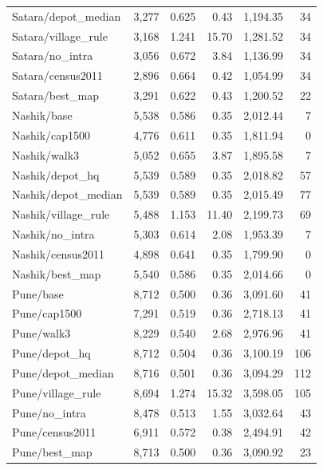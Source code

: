 \documentclass[11pt,a4paper,oneside]{report}
\begin{document}
\begin{center}
\begin{longtable}{p{4.5cm}rrrrr}
Satara/depot\_median & 3,277 & 0.625 & 0.43 & 1,194.35 & 34\\
Satara/village\_rule & 3,168 & 1.241 & 15.70 & 1,281.52 & 34\\
Satara/no\_intra & 3,056 & 0.672 & 3.84 & 1,136.99 & 34\\
Satara/census2011 & 2,896 & 0.664 & 0.42 & 1,054.99 & 34\\
Satara/best\_map & 3,291 & 0.622 & 0.43 & 1,200.52 & 22\\
Nashik/base & 5,538 & 0.586 & 0.35 & 2,012.44 & 7\\
Nashik/cap1500 & 4,776 & 0.611 & 0.35 & 1,811.94 & 0\\
Nashik/walk3 & 5,052 & 0.655 & 3.87 & 1,895.58 & 7\\
Nashik/depot\_hq & 5,539 & 0.589 & 0.35 & 2,018.82 & 57\\
Nashik/depot\_median & 5,539 & 0.589 & 0.35 & 2,015.49 & 77\\
Nashik/village\_rule & 5,488 & 1.153 & 11.40 & 2,199.73 & 69\\
Nashik/no\_intra & 5,303 & 0.614 & 2.08 & 1,953.39 & 7\\
Nashik/census2011 & 4,898 & 0.641 & 0.35 & 1,799.90 & 0\\
Nashik/best\_map & 5,540 & 0.586 & 0.35 & 2,014.66 & 0\\
Pune/base & 8,712 & 0.500 & 0.36 & 3,091.60 & 41\\
Pune/cap1500 & 7,291 & 0.519 & 0.36 & 2,718.13 & 41\\
Pune/walk3 & 8,229 & 0.540 & 2.68 & 2,976.96 & 41\\
Pune/depot\_hq & 8,712 & 0.504 & 0.36 & 3,100.19 & 106\\
Pune/depot\_median & 8,716 & 0.501 & 0.36 & 3,094.29 & 112\\
Pune/village\_rule & 8,694 & 1.274 & 15.32 & 3,598.05 & 105\\
Pune/no\_intra & 8,478 & 0.513 & 1.55 & 3,032.64 & 43\\
Pune/census2011 & 6,911 & 0.572 & 0.38 & 2,494.91 & 42\\
Pune/best\_map & 8,713 & 0.500 & 0.36 & 3,090.92 & 23\\
\end{longtable}
\end{center}
\end{document}
